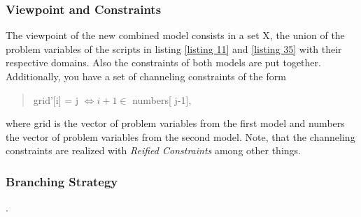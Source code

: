 \documentclass[a4paper]{scrartcl}
\begin{document}
\subsubsection{Viewpoint and Constraints}
The viewpoint of the new combined model consists in a set
X, the union of the problem variables of the scripts in listing
\ref{listing 11} and \ref{listing 35} with their respective
domains. Also the constraints of both models are put together.
Additionally, you have a set of channeling constraints of the
form
\begin{quote}
grid'[i] = j $\Leftrightarrow i+1 \in $ numbers[ j-1],
\end{quote}
where grid is the vector of problem variables from the first
model and numbers the vector of problem variables from the
second model. Note, that the channeling constraints are realized
with {\it Reified Constraints} among other things.

\subsubsection{Branching Strategy}
.
\end{document}
